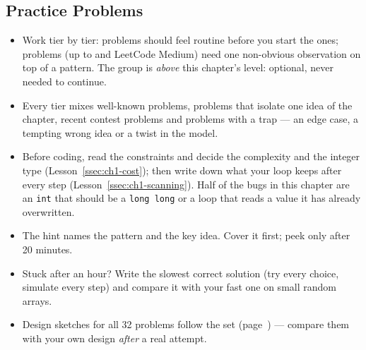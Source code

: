 \subsection{Practice Problems}
\label{ssec:ch1-problem-set}

\begin{insightbox}
\begin{itemize}[leftmargin=*]
    \item Work tier by tier: \exeasy{} problems should feel routine before you start the \exmedium{} ones; \exhard{} problems (up to  and LeetCode Medium) need one non-obvious observation on top of a pattern. The \exstretch{} group is \emph{above} this chapter's level: optional, never needed to continue.
    \item Every tier mixes well-known problems, problems that isolate one idea of the chapter, recent contest problems and problems with a trap --- an edge case, a tempting wrong idea or a twist in the model.
    \item Before coding, read the constraints and decide the complexity and the integer type (Lesson~\ref{ssec:ch1-cost}); then write down what your loop keeps after every step (Lesson~\ref{ssec:ch1-scanning}). Half of the bugs in this chapter are an \texttt{int} that should be a \texttt{long long} or a loop that reads a value it has already overwritten.
    \item The hint names the pattern and the key idea. Cover it first; peek only after 20 minutes.
    \item Stuck after an hour? Write the slowest correct solution (try every choice, simulate every step) and compare it with your fast one on small random arrays.
    \item Design sketches for all 32 problems follow the set (page~\pageref{ssec:ch1-sketches}) --- compare them with your own design \emph{after} a real attempt.
\end{itemize}
\end{insightbox}

